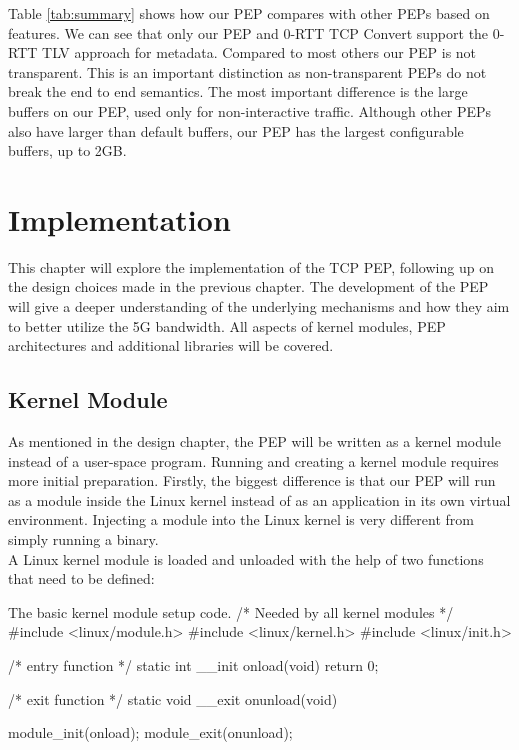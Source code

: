 \documentclass[a4paper,english, 11pt]{report}
\begin{document}
Table \ref{tab:summary} shows how our PEP compares with other PEPs based on features. We can see that only our PEP and 0-RTT TCP Convert support the 0-RTT TLV approach for metadata. Compared to most others our PEP is not transparent. This is an important distinction as non-transparent PEPs do not break the end to end semantics. The most important difference is the large buffers on our PEP, used only for non-interactive traffic. Although other PEPs also have larger than default buffers, our PEP has the largest configurable buffers, up to 2GB.\\




\chapter{Implementation}
This chapter will explore the implementation of the TCP PEP, following up on the design choices made in the previous chapter. The development of the PEP will give a deeper understanding of the underlying mechanisms and how they aim to better utilize the 5G bandwidth. All aspects of kernel modules, PEP architectures and additional libraries will be covered.

\section{Kernel Module}
As mentioned in the design chapter, the PEP will be written as a kernel module instead of a user-space program. Running and creating a kernel module requires more initial preparation. Firstly, the biggest difference is that our PEP will run as a module inside the Linux kernel instead of as an application in its own virtual environment. Injecting a module into the Linux kernel is very different from simply running a binary.\\

A Linux kernel module is loaded and unloaded with the help of two functions that need to be defined:\\

\begin{autonumlstlisting}[label=lst:module_example]{The basic kernel module setup code.}
/* Needed by all kernel modules */
#include <linux/module.h> 
#include <linux/kernel.h>
#include <linux/init.h>

/* entry function */
static int __init onload(void) {
    return 0;
}

/* exit function */
static void __exit onunload(void) {
    
}

module_init(onload);
module_exit(onunload);
\end{autonumlstlisting}
\end{document}
